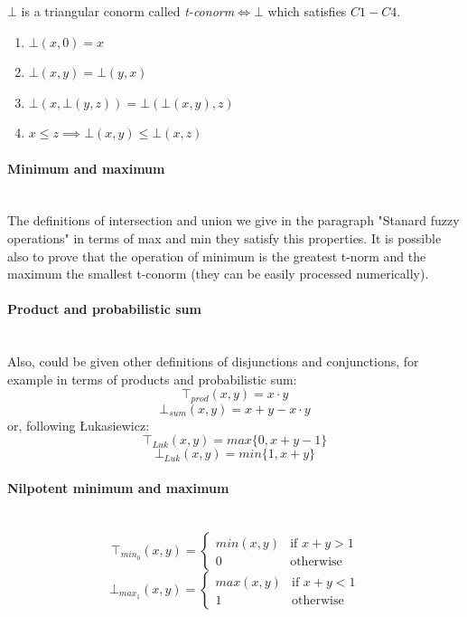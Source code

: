 \documentclass{article}
\begin{document}
\noindent $\bot$ is a triangular conorm called \textit{t-conorm}$\Longleftrightarrow\bot$ which
satisfies $C1-C4$.
\begin{enumerate}
    \item $\bot(x,0)=x$
    \item $\bot(x,y)=\bot(y,x)$
    \item $\bot(x,\bot(y,z))=\bot(\bot(x,y),z)$
    \item $x\leq z \implies\bot(x,y)\leq\bot(x,z)$
\end{enumerate}

\paragraph{Minimum and maximum}\mbox{}\\
The definitions of intersection and union we give in the paragraph "Stanard fuzzy operations"
in terms of max and min they satisfy this properties. It is possible also to prove that the
operation of minimum is the greatest t-norm and the maximum the smallest t-conorm (they
can be easily processed numerically).

\paragraph{Product and probabilistic sum}\mbox{}\\
Also, could be given other definitions of disjunctions and conjunctions, for example
in terms of products and probabilistic sum:
$$\top_{prod}(x,y)=x\cdot y$$
$$\bot_{sum}(x,y)=x+y-x\cdot y$$
or, following Łukasiewicz:
$$\top_{Luk}(x,y)=max\{0,x+y-1\}$$
$$\bot_{Luk}(x,y)=min\{1,x+y\}$$

\paragraph{Nilpotent minimum and maximum}\mbox{}\\
\[
    \top_{min_0}(x,y)=
    \begin{cases}
        min(x,y) & \text{if } x+y>1 \\
        0        & \text{otherwise}
    \end{cases}
\]
\[
    \bot_{max_1}(x,y)=
    \begin{cases}
        max(x,y) & \text{if }x+y<1  \\
        1        & \text{otherwise}
    \end{cases}
\]
\end{document}
